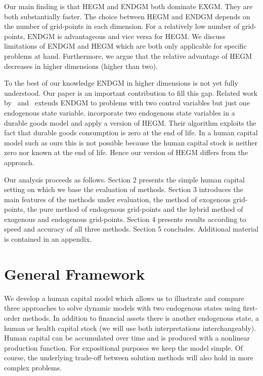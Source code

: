 \documentclass[a4paper,12pt]{article}%
\begin{document}
Our main finding is that HEGM and ENDGM both dominate EXGM. They are both
substantially faster. The choice between HEGM and ENDGM depends on the number
of grid-points in each dimension. For a relatively low number of grid-points,
ENDGM is advantageous and vice versa for HEGM. We discuss limitations of ENDGM
and HEGM which are both only applicable for specific problems at hand.
Furthermore, we argue that the relative advantage of HEGM decreases in higher
dimensions (higher than two).

To the best of our knowledge ENDGM in higher dimensions is not yet fully
understood. Our paper is an important contribution to fill this gap. Related
work by~%
and~%
extends ENDGM to problems with two control variables but just one endogenous
state variable.
incorporate two endogenous state variables in a durable goods model and apply
a version of HEGM. Their algorithm exploits the fact that durable goods
consumption is zero at the end of life. In a human capital model such as ours
this is not possible because the human capital stock is neither zero nor known
at the end of life. Hence our version of HEGM differs from the
approach.

Our analysis proceeds as follows. Section 2 presents the simple human capital
setting on which we base the evaluation of methods. Section 3 introduces the
main features of the methods under evaluation, the method of exogenous
grid-points, the pure method of endogenous grid-points and the hybrid method
of exogenous and endogenous grid-points. Section 4 presents results according
to speed and accuracy of all three methods. Section 5 concludes. Additional
material is contained in an appendix.

\section{General Framework}

We develop a human capital model which allows us to illustrate and compare
three approaches to solve dynamic models with two endogenous states using
first-order methods. In addition to financial assets there is another
endogenous state, a human or health capital stock (we will use both
interpretations interchangeably). Human capital can be accumulated over time
and is produced with a nonlinear production function. For expositional
purposes we keep the model simple. Of course, the underlying trade-off between
solution methods will also hold in more complex problems.
\end{document}
